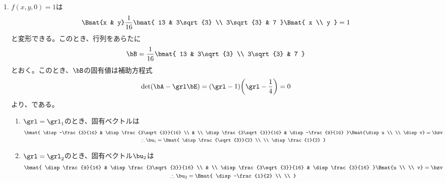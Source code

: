 \begin{ans*}
\begin{enumerate}[label=(\arabic*)]
    \item $f(x,y,0) = 1$は
    \begin{gather}
      \Bmat{x & y}\frac{1}{16}
      \bmat{
        13 & 3\sqrt{3} \\
        3\sqrt{3} & 7
      }\Bmat{
        x \\ y
      } = 1
    \end{gather}
    と変形できる。このとき、行列をあらたに
    \begin{gather}
      \bB =\frac{1}{16}\bmat{
        13 & 3\sqrt{3} \\
        3\sqrt{3} & 7
      }
    \end{gather}
    とおく。このとき、$\bB$の固有値は補助方程式
    \begin{align}
      \det(\bA - \grl\bE) = (\grl - 1)\biggl(\grl - \frac{1}{4}\biggr) = 0
    \end{align}
    より、である。
    \begin{enumerate}[label=(\roman*)]
      \item $\grl = \grl_1$のとき、固有ベクトルは
      \begin{gather}
        \bmat{
          \disp -\frac{3}{16} & \disp \frac{3\sqrt{3}}{16} \\
          & \\
          \disp \frac{3\sqrt{3}}{16} & \disp-\frac{9}{16}
        }\Bmat{\disp u \\ \\ \disp v} = \bzv \\
        \therefore \bu_1 = \Bmat{
          \disp \frac{\sqrt{3}}{2} \\
          \\
          \disp \frac{1}{2}
        }
      \end{gather}
      \item $\grl = \grl_2$のとき、固有ベクトル$\bu_2$は
      \begin{gather}
        \bmat{
          \disp \frac{9}{16} & \disp \frac{3\sqrt{3}}{16} \\
          & \\
          \disp \frac{3\sqrt{3}}{16} & \disp\frac{3}{16}
        }\Bmat{u  \\ \\ v} = \bzv \\
        \therefore \bu_2 = \Bmat{
          \disp -\frac{1}{2} \\
          \\
}
\end{gather}
\end{enumerate}
\end{enumerate}
\end{ans*}
